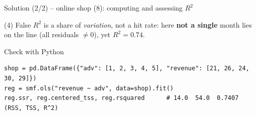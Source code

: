 \documentclass[aspectratio=169,11pt]{beamer}
\begin{document}
\begin{frame}[fragile]{Solution (2/2) -- online shop (8): computing and assessing $R^2$}
  \begin{alertblock}{(4) False}
    $R^2$ is a share of \emph{variation}, not a hit rate: here \textbf{not a
    single} month lies on the line (all residuals $\neq 0$), yet
    $R^2=0.74$.
  \end{alertblock}
  \begin{block}{Check with Python}
\begin{lstlisting}
shop = pd.DataFrame({"adv": [1, 2, 3, 4, 5], "revenue": [21, 26, 24, 30, 29]})
reg = smf.ols("revenue ~ adv", data=shop).fit()
reg.ssr, reg.centered_tss, reg.rsquared      # 14.0  54.0  0.7407 (RSS, TSS, R^2)
\end{lstlisting}
  \end{block}
\end{frame}
\end{document}
